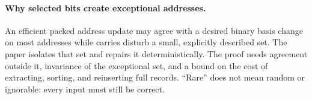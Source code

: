 \paragraph{Why selected bits create exceptional addresses.}
An efficient packed address update may agree with a desired binary basis
change on most addresses while carries disturb a small, explicitly described
set. The paper isolates that set and repairs it deterministically. The proof
needs agreement outside it, invariance of the exceptional set, and a bound on
the cost of extracting, sorting, and reinserting full records. ``Rare'' does
not mean random or ignorable: every input must still be correct.

